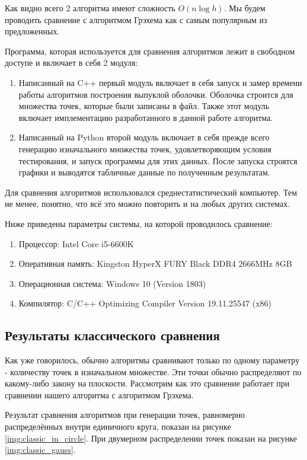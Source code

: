 Как видно всего 2 алгоритма имеют сложность $O(n \log h)$. Мы будем проводить сравнение с алгоритмом Грэхема как с самым популярным из предложенных.

Программа, которая используется для сравнения алгоритмов лежит в свободном доступе \cite{matrokhin2017github} и включает в себя 2 модуля:
\begin{enumerate}
	\item Написанный на C++ первый модуль включает в себя запуск и замер времени работы алгоритмов построения выпуклой оболочки. Оболочка строится для множества точек, которые были записаны в файл. Также этот модуль включает имплементацию разработанного в данной работе алгоритма.
	\item Написанный на Python второй модуль включает в себя прежде всего генерацию изначального множества точек, удовлетворяющим условия тестирования, и запуск программы для этих данных. После запуска строятся графики и выводятся табличные данные по полученным результатам.
\end{enumerate}

Для сравнения алгоритмов использовался среднестатистический компьютер. Тем не менее, понятно, что всё это можно повторить и на любых других системах.

Ниже приведены параметры системы, на которой проводилось сравнение:
\begin{enumerate}
	\item Процессор: Intel Core i5-6600K
	\item Оперативная память: Kingston HyperX FURY Black DDR4 2666MHz 8GB
	\item Операционная система: Windows 10 (Version 1803)
	\item Компилятор: C/C++ Optimizing Compiler Version 19.11.25547 (x86)
\end{enumerate}

\subsection{Результаты классического сравнения}

Как уже говорилось, обычно алгоритмы сравнивают только по одному параметру - количеству точек в изначальном множестве. Эти точки обычно распределяют по какому-либо закону на плоскости. Рассмотрим как это сравнение работает при сравнении нашего алгоритма с алгоритмом Грэхема.

Результат сравнения алгоритмов при генерации точек, равномерно распределённых внутри единичного круга, показан на рисунке \ref{img:classic_in_circle}. При двумерном распределении точек показан на рисунке \ref{img:classic_gauss}.

